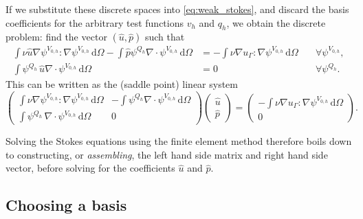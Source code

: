 \documentclass[thesis]{subfiles}
\begin{document}
If we substitute these discrete spaces into \cref{eq:weak_stokes}, and discard the basis coefficients for the arbitrary test functions $v_h$ and $q_h$, we obtain the discrete problem: find the vector $(\hat u, \hat p)$ such that
\small
\begin{equation}
  \begin{aligned}
    \int \nu \hat u \nabla \psi^{V_{0,h}} : \nabla \psi^{V_{0,h}} \, \textrm{d}\Omega
    - \int \hat p \psi^{Q_h} \nabla \cdot \psi^{V_{0,h}} \, \textrm{d}\Omega
    &=
    - \int \nu \nabla u_\Gamma : \nabla \psi^{V_{0,h}} \, \textrm{d}\Omega
    \quad
    &\forall \psi^{V_{0,h}}, \\
    \int \psi^{Q_h} \, \hat u \nabla \cdot \psi^{V_{0,h}} \, \textrm{d}\Omega
    &= 0
    \quad
    &\forall \psi^{Q_h}.
  \end{aligned}
\end{equation}
\normalsize
This can be written as the (saddle point) linear system
\small
\begin{equation} \label{eq:stokes_linear_system}
  \left (
  \begin{array}{c|c}
    \int \nu \nabla \psi^{V_{0,h}} : \nabla \psi^{V_{0,h}} \, \textrm{d}\Omega
    &
    - \int \psi^{Q_h} \nabla \cdot \psi^{V_{0,h}} \, \textrm{d}\Omega \\
    \hline
    \int \psi^{Q_h} \, \nabla \cdot \psi^{V_{0,h}} \, \textrm{d}\Omega
    &
    0
  \end{array}
  \right )
  \left (
  \begin{array}{c}
    \hat u \\
    \hline
    \hat p
  \end{array}
  \right )
  =
  \left (
  \begin{array}{c}
    - \int \nu \nabla u_\Gamma : \nabla \psi^{V_{0,h}} \, \textrm{d}\Omega \\
    \hline
    0
  \end{array}
  \right ).
\end{equation}
\normalsize

Solving the Stokes equations using the finite element method therefore boils down to constructing, or \emph{assembling}, the left hand side matrix and right hand side vector, before solving for the coefficients $\hat u$ and $\hat p$.

\subsection{Choosing a basis}
\end{document}
